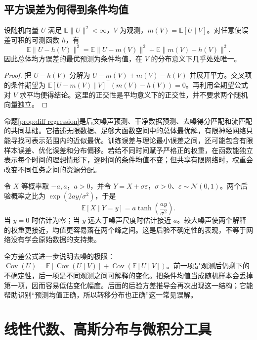 \documentclass[UTF8,12pt,a4paper,fontset=fandol]{ctexart}
\begin{document}
\subsection{平方误差为何得到条件均值}
\begin{proposition}[条件均值的最小平方误差性质]
\label{prop:diff-regression}
设随机向量 $U$ 满足 $\mathbb E\|U\|^2<\infty$，$V$ 为观测，$m(V)=\mathbb E[U\mid V]$。对任意使误差可积的可测函数 $h$，有
\begin{equation}
 \mathbb E\|U-h(V)\|^2
 =\mathbb E\|U-m(V)\|^2+\mathbb E\|m(V)-h(V)\|^2.
 \label{eq:diff-projection}
\end{equation}
因此总体均方误差的最优预测为条件均值，在 $V$ 的分布意义下几乎处处唯一。
\end{proposition}
\begin{proof}
把 $U-h(V)$ 分解为 $U-m(V)+m(V)-h(V)$ 并展开平方。交叉项的条件期望为 $\mathbb E[U-m(V)\mid V]^\mathsf T(m(V)-h(V))=0$。再利用全期望公式对 $V$ 求平均便得结论。这里的正交性是平均意义下的正交性，并不要求两个随机向量独立。
\end{proof}

命题\ref{prop:diff-regression}是后文噪声预测、干净数据预测、去噪得分匹配和流匹配的共同基础。它描述无限数据、足够大函数空间中的总体最优解，有限神经网络只能寻找可表示范围内的近似最优。训练误差与理论最小误差之间，还可能包含有限样本误差、优化误差和分布偏移。若给不同时间赋予严格正的权重，在函数能独立表示每个时间的理想情形下，逐时间的条件均值不变；但共享有限网络时，权重会改变不同任务之间的资源分配。

\begin{example}[双点数据的后验均值]
\label{ex:diff-two-point}
令 $X$ 等概率取 $-a,a$，$a>0$，并令 $Y=X+\sigma\varepsilon$，$\sigma>0$、$\varepsilon\sim\mathcal N(0,1)$。两个后验概率之比为 $\exp(2ay/\sigma^2)$，于是
\[
 \mathbb E[X\mid Y=y]=a\tanh\!\left(\frac{ay}{\sigma^2}\right).
\]
当 $y=0$ 时估计为零；当 $y$ 远大于噪声尺度时估计接近 $a$。较大噪声使两个解释的权重更接近，均值更容易落在两个峰之间。这是后验不确定性的表现，不等于网络没有学会原始数据的支持集。
\end{example}

全方差公式进一步说明去噪的极限：$\operatorname{Cov}(U)=\mathbb E[\operatorname{Cov}(U\mid V)]+\operatorname{Cov}(\mathbb E[U\mid V])$。前一项是观测后仍剩下的不确定性，后一项是不同观测之间可解释的变化。把条件均值当成随机样本会丢掉第一项，因而容易低估变化幅度。后面的后验方差推导会再次出现这一结构；它能帮助识别“预测均值正确，所以转移分布也正确”这一常见误解。

\section{线性代数、高斯分布与微积分工具}
\label{sec:diff-gaussian}
\end{document}
